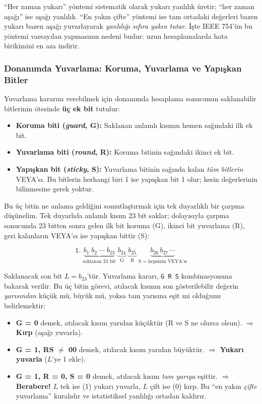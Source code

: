 ``Her zaman yukarı'' yöntemi sistematik olarak yukarı yanlılık üretir; ``her zaman aşağı'' ise aşağı yanlılık. ``En yakın çifte'' yöntemi ise tam ortadaki değerleri bazen yukarı bazen aşağı yuvarlayarak \emph{yanlılığı sıfıra yakın tutar}. İşte IEEE 754'ün bu yöntemi varsayılan yapmasının nedeni budur: uzun hesaplamalarda hata birikimini en aza indirir.

\subsubsection{Donanımda Yuvarlama: Koruma, Yuvarlama ve Yapışkan Bitler}

Yuvarlama kararını verebilmek için donanımda hesaplama sonucunun saklanabilir bitlerinin ötesinde \textbf{üç ek bit} tutulur:

\begin{itemize}
\item \textbf{Koruma biti (\emph{guard}, G):} Saklanan anlamlı kısmın hemen sağındaki ilk ek bit.
\item \textbf{Yuvarlama biti (\emph{round}, R):} Koruma bitinin sağındaki ikinci ek bit.
\item \textbf{Yapışkan bit (\emph{sticky}, S):} Yuvarlama bitinin sağında kalan \emph{tüm bitlerin} VEYA'sı. Bu bitlerin herhangi biri 1 ise yapışkan bit 1 olur; kesin değerlerinin bilinmesine gerek yoktur.
\end{itemize}

Bu üç bitin ne anlama geldiğini somutlaştırmak için tek duyarlıklı bir çarpma düşünelim. Tek duyarlıda anlamlı kısım 23 bit saklar; dolayısıyla çarpma sonucunda 23 bitten sonra gelen ilk bit koruma (G), ikinci bit yuvarlama (R), geri kalanların VEYA'sı ise yapışkan bittir (S):

\[
\texttt{1.}\;\underbrace{b_1 \; b_2 \; \cdots \; b_{23}}_{\text{saklanan 23 bit}} \;\underbrace{b_{24}}_{\text{G}} \;\underbrace{b_{25}}_{\text{R}} \;\underbrace{b_{26} \, b_{27} \, \cdots}_{\text{S = hepsinin VEYA'sı}}
\]

Saklanacak son bit $L = b_{23}$'tür. Yuvarlama kararı, \texttt{G\,R\,S} kombinasyonuna bakarak verilir. Bu üç bitin görevi, atılacak kısmın son gösterilebilir değerin \emph{yarısından} küçük mü, büyük mü, yoksa tam yarısına eşit mi olduğunu belirlemektir:

\begin{itemize}
\item \textbf{G = 0} demek, atılacak kısım yarıdan küçüktür (R ve S ne olursa olsun). $\Rightarrow$ \textbf{Kırp} (aşağı yuvarla).
\item \textbf{G = 1, RS $\neq$ 00} demek, atılacak kısım yarıdan büyüktür. $\Rightarrow$ \textbf{Yukarı yuvarla} ($L$'ye 1 ekle).
\item \textbf{G = 1, R = 0, S = 0} demek, atılacak kısım \emph{tam yarıya} eşittir. $\Rightarrow$ \textbf{Berabere!} $L$ tek ise (1) yukarı yuvarla, $L$ çift ise (0) kırp. Bu ``en yakın \emph{çifte} yuvarlama'' kuralıdır ve istatistiksel yanlılığı ortadan kaldırır.
\end{itemize}

